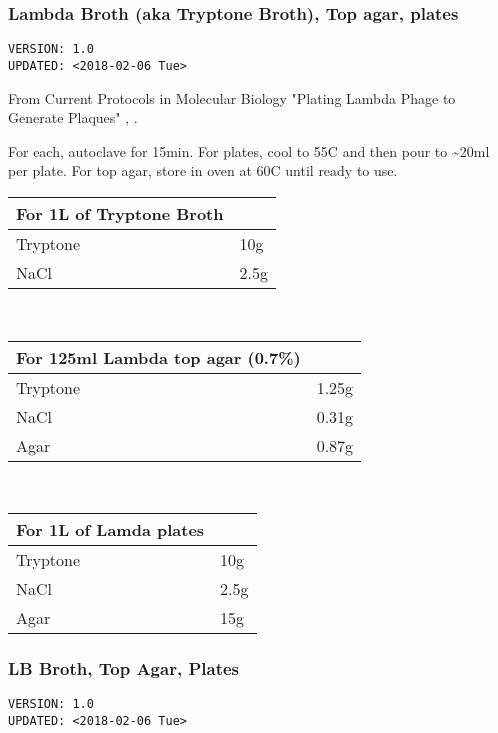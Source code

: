 \documentclass[11pt]{article}
\begin{document}
\subsubsection[\label{org9355249} Lambda Broth (aka Tryptone Broth), Top agar, plates]{\label{orgc16f60e} Lambda Broth (aka Tryptone Broth), Top agar, plates}
\label{sec:orgf10b47b}
\begin{verbatim}
VERSION: 1.0
UPDATED: <2018-02-06 Tue>
\end{verbatim}

From Current Protocols in Molecular Biology "Plating Lambda Phage to Generate Plaques" \cite{lech2001}, \cite{Elbing2001}.

For each, autoclave for 15min. For plates, cool to 55C and then pour to \textasciitilde{}20ml per plate. For top agar, store in oven at 60C until ready to use. 

\begin{center}
\begin{tabular}{ll}
For 1L of \textbf{Tryptone Broth} & \\
\hline
Tryptone & 10g\\
NaCl & 2.5g\\
\end{tabular}
\end{center}

\\

\begin{center}
\begin{tabular}{ll}
For 125ml \textbf{Lambda top agar (0.7\%)} & \\
\hline
Tryptone & 1.25g\\
NaCl & 0.31g\\
Agar & 0.87g\\
\end{tabular}
\end{center}

\\

\begin{center}
\begin{tabular}{ll}
For 1L of \textbf{Lamda plates} & \\
\hline
Tryptone & 10g\\
NaCl & 2.5g\\
Agar & 15g\\
\end{tabular}
\end{center}

\subsubsection[\label{org18e3ab0} LB Broth, Top Agar, Plates]{\label{orgab218f9} LB Broth, Top Agar, Plates}
\label{sec:org32ffcb1}
\begin{verbatim}
VERSION: 1.0
UPDATED: <2018-02-06 Tue>
\end{verbatim}
\end{document}
